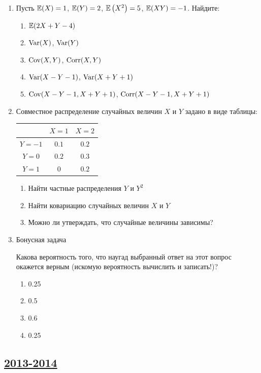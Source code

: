 \begin{enumerate}
\item Пусть $\operatorname{\mathbb{E}}(X) = 1$, $\operatorname{\mathbb{E}}(Y) = 2$, $\operatorname{\mathbb{E}}\left(X^2\right) = 5$, $\operatorname{\mathbb{E}}(XY) = -1$. Найдите:
\begin{enumerate}
\item $\operatorname{\mathbb{E}}(2X + Y - 4)$
\item $\operatorname{Var}(X)$, $\operatorname{Var}(Y)$
\item $\operatorname{Cov}(X,Y)$, $\operatorname{Corr}(X,Y)$
\item $\operatorname{Var}(X-Y-1)$,  $\operatorname{Var}(X+Y+1)$
\item $\operatorname{Cov}(X-Y-1, X+Y+1)$,  $\operatorname{Corr}(X-Y-1, X+Y+1)$
\end{enumerate}

\item Совместное распределение случайных величин $X$ и $Y$ задано в виде таблицы:

\begin{center}
\begin{tabular}{ccc}
\toprule
 & $X=1$ & $X=2$ \\ \midrule
$Y=-1$ & $0.1$ & $0.2$ \\
$Y=0$ & $0.2$ & $0.3$ \\
$Y=1$ & $0$ & $0.2$ \\ \bottomrule
\end{tabular}
\end{center}

\begin{enumerate}
\item Найти частные распределения $Y$ и $Y^2$
\item Найти ковариацию случайных величин $X$ и $Y$
\item Можно ли утверждать, что случайные величины зависимы?
\end{enumerate}

\item Бонусная задача

Какова вероятность того, что наугад выбранный ответ на этот вопрос окажется верным
(искомую вероятность вычислить и записать!)?
\begin{enumerate}
\item 0.25
\item 0.5
\item 0.6
\item 0.25
\end{enumerate}
\end{enumerate}



\newpage
\subsection[2013-2014]{\hyperref[sec:sol_kr_01_2013_2014]{2013-2014}}
\label{sec:kr_01_2013_2014}


